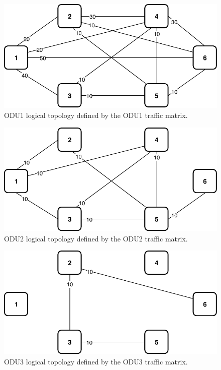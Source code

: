 \begin{figure}[h!]
\centering
\includegraphics[width=12cm]{sdf/ilp/translucent_survivability/figures/logical_topology_ODU1_medium}
\caption{ODU1 logical topology defined by the ODU1 traffic matrix.}
\label{logical3_ODU1_medium}
\end{figure}

\begin{figure}[h!]
\centering
\includegraphics[width=12cm]{sdf/ilp/translucent_survivability/figures/logical_topology_ODU2_medium}
\caption{ODU2 logical topology defined by the ODU2 traffic matrix.}
\label{logical3_ODU2_medium}
\end{figure}

\begin{figure}[h!]
\centering
\includegraphics[width=12cm]{sdf/ilp/translucent_survivability/figures/logical_topology_ODU3_medium}
\caption{ODU3 logical topology defined by the ODU3 traffic matrix.}
\label{logical3_ODU3_medium}
\end{figure}

